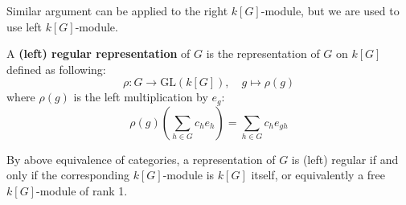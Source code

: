 \begin{remark}
    Similar argument can be applied to the right \(k[G]\)-module, but we are used to use left \(k[G]\)-module.
\end{remark}

\begin{colordefinition}
    A \textbf{(left) regular representation} of \(G\) is the representation of \(G\) on \(k[G]\) defined as following:
    \[\rho: G \to \mathrm{GL}(k[G]), \quad g \mapsto \rho(g)\]
    where \(\rho(g)\) is the left multiplication by \(e_g\):
    \[\rho(g)(\sum_{h \in G}c_he_h) = \sum_{h \in G}c_h e_{gh}\]
\end{colordefinition}

\begin{remark}
    By above equivalence of categories, a representation of \(G\) is (left) regular if and only if the corresponding \(k[G]\)-module is \(k[G]\) itself, or equivalently a free \(k[G]\)-module of rank 1.
\end{remark}

